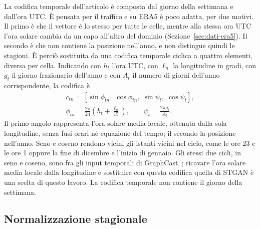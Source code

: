 La codifica temporale dell'articolo è composta dal giorno della settimana e dall'ora UTC. È pensata per il traffico e su ERA5 è poco adatta, per due motivi. Il primo è che il vettore è lo stesso per tutte le celle, mentre alla stessa ora UTC l'ora solare cambia da un capo all'altro del dominio (Sezione~\ref{sec:dati-era5}). Il secondo è che non contiene la posizione nell'anno, e non distingue quindi le stagioni. È perciò sostituita da una codifica temporale ciclica a quattro elementi, diversa per cella. Indicando con $h_t$ l'ora UTC, con $\ell_n$ la longitudine in gradi, con $g_t$ il giorno frazionario dell'anno e con $A_t$ il numero di giorni dell'anno corrispondente, la codifica è
\begin{equation}
\begin{gathered}
c_{tn}=\left[
\sin\phi_{tn},\;\cos\phi_{tn},\;
\sin\psi_{t},\;\cos\psi_{t}\right],
\\
\phi_{tn}=\frac{2\pi}{24}\left(h_t+\frac{\ell_n}{15}\right),
\qquad
\psi_t=\frac{2\pi g_t}{A_t}.
\end{gathered}
\end{equation}
Il primo angolo rappresenta l'ora solare media locale, ottenuta dalla sola longitudine, senza fusi orari né equazione del tempo; il secondo la posizione nell'anno. Seno e coseno rendono vicini gli istanti vicini nel ciclo, come le ore 23 e le ore 1 oppure la fine di dicembre e l'inizio di gennaio. Gli stessi due cicli, in seno e coseno, sono fra gli input temporali di GraphCast~\cite{lam2023graphcast}; ricavare l'ora solare media locale dalla longitudine e sostituire con questa codifica quella di STGAN è una scelta di questo lavoro. La codifica temporale non contiene il giorno della settimana.

\subsection{Normalizzazione stagionale}

